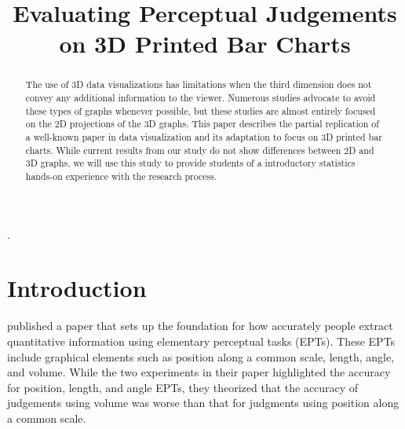 \documentclass[letterpaper,inpress]{jdsart}
\begin{document}
\begin{frontmatter}

\title{Evaluating Perceptual Judgements on 3D Printed Bar Charts}

\author[1]{
      }
\author[1]{
    }

\address[1]{Department of Statistics, 
  , }

\begin{abstract}
The use of 3D data visualizations has limitations when the third dimension does not convey any additional information to the viewer. Numerous studies advocate to avoid these types of graphs whenever possible, but these studies are almost entirely focused on the 2D projections of the 3D graphs. This paper describes the partial replication of a well-known paper in data visualization and its adaptation to focus on 3D printed bar charts. While current results from our study do not show differences between 2D and 3D graphs, we will use this study to provide students of a introductory statistics hands-on experience with the research process.
\end{abstract}

\begin{keywords}
.
\end{keywords}

\end{frontmatter}

\hypertarget{introduction}{%
\section{Introduction}\label{introduction}}

\citet{cleveland_graphical_1984} published a paper that sets up the foundation for how accurately people extract quantitative information using elementary perceptual tasks (EPTs). These EPTs include graphical elements such as position along a common scale, length, angle, and volume. While the two experiments in their paper highlighted the accuracy for position, length, and angle EPTs, they theorized that the accuracy of judgements using volume was worse than that for judgments using position along a common scale.
\end{document}
